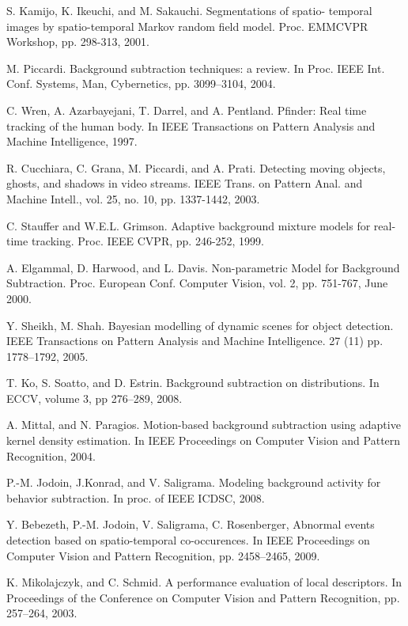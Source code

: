 \documentclass[conference]{IEEEtran}
\begin{document}
\begin{thebibliography}{19}

  S. Kamijo, K. Ikeuchi, and M. Sakauchi. Segmentations of spatio- temporal images by spatio-temporal Markov random field model. Proc. EMMCVPR Workshop, pp. 298-313, 2001.

  M. Piccardi. Background subtraction techniques: a review. In Proc. IEEE Int. Conf. Systems, Man, Cybernetics, pp. 3099–3104, 2004.

  C. Wren, A. Azarbayejani, T. Darrel, and A. Pentland. Pfinder: Real time tracking of the human body. In IEEE Transactions on Pattern Analysis and Machine Intelligence, 1997.

  R. Cucchiara, C. Grana, M. Piccardi, and A. Prati. Detecting moving objects, ghosts, and shadows in video streams. IEEE Trans. on Pattern Anal. and Machine Intell., vol. 25, no. 10, pp. 1337-1442, 2003.

  C. Stauffer and W.E.L. Grimson. Adaptive background mixture models for real-time tracking. Proc. IEEE CVPR, pp. 246-252, 1999.

  A. Elgammal, D. Harwood, and L. Davis. Non-parametric Model for Background Subtraction. Proc. European Conf. Computer Vision, vol. 2, pp. 751-767, June 2000.

  Y. Sheikh, M. Shah. Bayesian modelling of dynamic scenes for object detection. IEEE Transactions on Pattern Analysis and Machine Intelligence. 27 (11) pp. 1778–1792, 2005.

  T. Ko, S. Soatto, and D. Estrin. Background subtraction on distributions. In ECCV, volume 3, pp 276–289, 2008.

  A. Mittal, and N. Paragios. Motion-based background subtraction using adaptive kernel density estimation. In IEEE Proceedings on Computer Vision and Pattern Recognition, 2004.

  P.-M. Jodoin, J.Konrad, and V. Saligrama. Modeling background activity for behavior subtraction. In proc. of IEEE ICDSC, 2008.

  Y. Bebezeth, P.-M. Jodoin, V. Saligrama, C. Rosenberger, Abnormal events detection based on spatio-temporal co-occurences. In IEEE Proceedings on Computer Vision and Pattern Recognition, pp. 2458–2465, 2009.

  K. Mikolajczyk, and C. Schmid. A performance evaluation of local descriptors. In Proceedings of the Conference on Computer Vision and Pattern Recognition, pp. 257–264, 2003.


\end{thebibliography}
\end{document}
